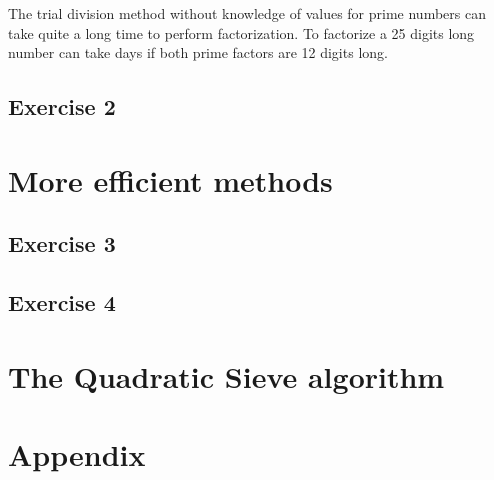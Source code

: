 \documentclass{article}
\begin{document}
The trial division method without knowledge of values for prime numbers can take quite a long time to perform factorization. To factorize a 25 digits long number can take days if both prime factors are 12 digits long.

\subsection{Exercise 2}

\section{More efficient methods}

\subsection{Exercise 3}

\subsection{Exercise 4}

\section{The Quadratic Sieve algorithm}

\section{Appendix}
\end{document}
